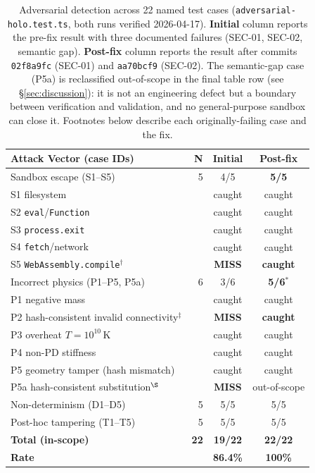 \documentclass[letterpaper,twocolumn,10pt]{article}
\providecommand{\measuredFrom}[1]{}
\begin{document}
\begin{table}[t]
\centering
\caption{Adversarial detection across 22 named test cases
  (\texttt{adversarial-holo.test.ts}, both runs verified 2026-04-17).
  \textbf{Initial} column reports the pre-fix result with three
  documented failures (SEC-01, SEC-02, semantic gap). \textbf{Post-fix}
  column reports the result after commits \texttt{02f8a9fc} (SEC-01)
  and \texttt{aa70bcf9} (SEC-02). The semantic-gap case (P5a) is
  reclassified out-of-scope in the final table row (see
  \S\ref{sec:discussion}): it is not an engineering defect but a
  boundary between verification and validation, and no general-purpose
  sandbox can close it. Footnotes below describe each originally-failing
  case and the fix.}
\label{tab:attack-detection}
\small
\measuredFrom{HoloScript/packages/security-sandbox/src/__tests__/adversarial-holo.test.ts}%
\begin{tabular}{@{}lrcc@{}}
\toprule
\textbf{Attack Vector (case IDs)} & \textbf{N} & \textbf{Initial} & \textbf{Post-fix} \\
\midrule
Sandbox escape (S1--S5)              & 5 & 4/5 & \textbf{5/5} \\
\quad S1 filesystem                  &   & caught & caught \\
\quad S2 \texttt{eval}/\texttt{Function}& & caught & caught \\
\quad S3 \texttt{process.exit}       &   & caught & caught \\
\quad S4 \texttt{fetch}/network      &   & caught & caught \\
\quad S5 \texttt{WebAssembly.compile}$^{\dagger}$ && \textbf{MISS} & \textbf{caught} \\
Incorrect physics (P1--P5, P5a)      & 6 & 3/6 & \textbf{5/6}$^{\ast}$ \\
\quad P1 negative mass               &   & caught & caught \\
\quad P2 hash-consistent invalid connectivity$^{\ddagger}$ && \textbf{MISS} & \textbf{caught} \\
\quad P3 overheat $T{=}10^{10}$\,K   &   & caught & caught \\
\quad P4 non-PD stiffness            &   & caught & caught \\
\quad P5 geometry tamper (hash mismatch) && caught & caught \\
\quad P5a hash-consistent substitution$^{\S}$ && \textbf{MISS} & out-of-scope \\
Non-determinism (D1--D5)             & 5 & 5/5 & 5/5 \\
Post-hoc tampering (T1--T5)          & 5 & 5/5 & 5/5 \\
\midrule
\textbf{Total (in-scope)}            & \textbf{22} & \textbf{19/22} & \textbf{22/22} \\
\textbf{Rate}                        &             & \textbf{86.4\%} & \textbf{100\%} \\
\bottomrule
\end{tabular}
\end{table}
\end{document}
